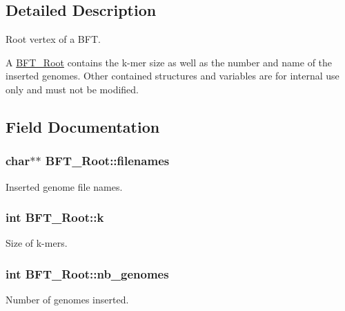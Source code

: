 \subsection{Detailed Description}
Root vertex of a B\+F\+T. 

A \hyperlink{structBFT__Root}{B\+F\+T\+\_\+\+Root} contains the k-\/mer size as well as the number and name of the inserted genomes. Other contained structures and variables are for internal use only and must not be modified. 

\subsection{Field Documentation}
\hypertarget{structBFT__Root_a8022a504e2c0dd2d800efda892413ce7}{}
\subsubsection[{filenames}]{\setlength{\rightskip}{0pt plus 5cm}char$\ast$$\ast$ B\+F\+T\+\_\+\+Root\+::filenames}\label{structBFT__Root_a8022a504e2c0dd2d800efda892413ce7}


Inserted genome file names. 

\hypertarget{structBFT__Root_ac496349ff4cba68727c5e38d4200848e}{}
\subsubsection[{k}]{\setlength{\rightskip}{0pt plus 5cm}int B\+F\+T\+\_\+\+Root\+::k}\label{structBFT__Root_ac496349ff4cba68727c5e38d4200848e}


Size of k-\/mers. 

\hypertarget{structBFT__Root_aaa57149b486231b370c0d9287e7e5328}{}
\subsubsection[{nb\+\_\+genomes}]{\setlength{\rightskip}{0pt plus 5cm}int B\+F\+T\+\_\+\+Root\+::nb\+\_\+genomes}\label{structBFT__Root_aaa57149b486231b370c0d9287e7e5328}


Number of genomes inserted. 

